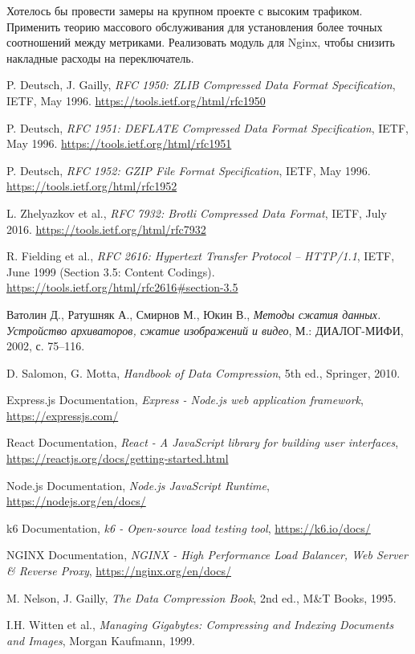 \documentclass[12pt]{article}
\begin{document}
Хотелось бы провести замеры на крупном проекте с высоким трафиком. Применить теорию массового обслуживания для установления более точных
соотношений между метриками. Реализовать модуль для Nginx, чтобы снизить накладные расходы на переключатель.
\begin{thebibliography}{9}
    P. Deutsch, J. Gailly,
    \textit{RFC 1950: ZLIB Compressed Data Format Specification},
    IETF, May 1996.
    \url{https://tools.ietf.org/html/rfc1950}

    P. Deutsch,
    \textit{RFC 1951: DEFLATE Compressed Data Format Specification},
    IETF, May 1996.
    \url{https://tools.ietf.org/html/rfc1951}

    P. Deutsch,
    \textit{RFC 1952: GZIP File Format Specification},
    IETF, May 1996.
    \url{https://tools.ietf.org/html/rfc1952}

    L. Zhelyazkov et al.,
    \textit{RFC 7932: Brotli Compressed Data Format},
    IETF, July 2016.
    \url{https://tools.ietf.org/html/rfc7932}

    R. Fielding et al.,
    \textit{RFC 2616: Hypertext Transfer Protocol -- HTTP/1.1},
    IETF, June 1999 (Section 3.5: Content Codings).
    \url{https://tools.ietf.org/html/rfc2616#section-3.5}

    Ватолин Д., Ратушняк А., Смирнов М., Юкин В.,
    \textit{Методы сжатия данных. Устройство архиваторов, сжатие изображений и видео},
    М.: ДИАЛОГ-МИФИ, 2002, с. 75--116.

    D. Salomon, G. Motta,
    \textit{Handbook of Data Compression},
    5th ed., Springer, 2010.

    Express.js Documentation,
    \textit{Express - Node.js web application framework},
    \url{https://expressjs.com/}

    React Documentation,
    \textit{React - A JavaScript library for building user interfaces},
    \url{https://reactjs.org/docs/getting-started.html}

    Node.js Documentation,
    \textit{Node.js JavaScript Runtime},
    \url{https://nodejs.org/en/docs/}

    k6 Documentation,
    \textit{k6 - Open-source load testing tool},
    \url{https://k6.io/docs/}

    NGINX Documentation,
    \textit{NGINX - High Performance Load Balancer, Web Server \& Reverse Proxy},
    \url{https://nginx.org/en/docs/}

    M. Nelson, J. Gailly,
    \textit{The Data Compression Book},
    2nd ed., M\&T Books, 1995.

    I.H. Witten et al.,
    \textit{Managing Gigabytes: Compressing and Indexing Documents and Images},
    Morgan Kaufmann, 1999.
\end{thebibliography}
\end{document}
